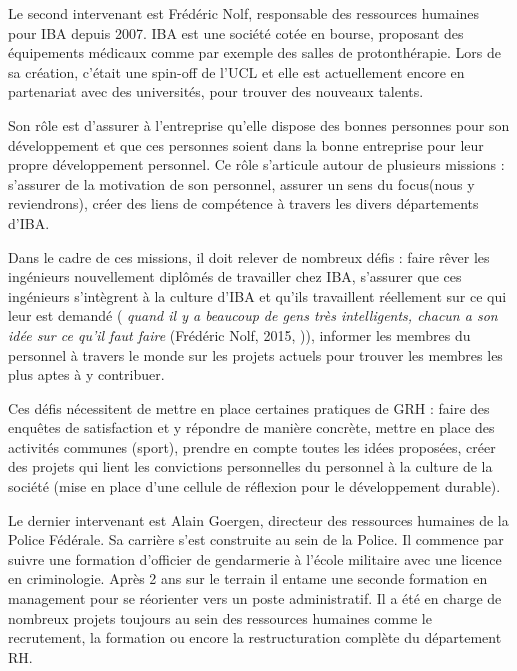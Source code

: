 Le second intervenant est Frédéric Nolf, responsable des ressources humaines pour IBA depuis 2007. IBA est une société cotée en bourse, proposant des équipements médicaux comme par exemple des salles de protonthérapie. Lors de sa création, c'était une spin-off de l'UCL et elle est actuellement encore en partenariat avec des universités, pour trouver des nouveaux talents. \newline

Son rôle est d'assurer à l'entreprise qu'elle dispose des bonnes personnes pour son développement et que ces personnes soient dans la bonne entreprise pour leur propre développement personnel. Ce rôle s'articule autour de plusieurs missions : s'assurer de la motivation de son personnel, assurer un \og{}sens du focus\fg{}(nous y reviendrons), créer des liens de compétence à travers les divers départements d'IBA. \newline

Dans le cadre de ces missions, il doit relever de nombreux défis : faire rêver les ingénieurs nouvellement diplômés de travailler chez IBA, s'assurer que ces ingénieurs s'intègrent à la culture d'IBA et qu'ils travaillent réellement sur ce qui leur est demandé (\textit{\og{} quand il y a beaucoup de gens très intelligents, chacun a son idée sur ce qu'il faut faire \fg{}} (Frédéric Nolf, 2015, \cite{tableronde})), informer les membres du personnel à travers le monde sur les projets actuels pour trouver les membres les plus aptes à y contribuer. \newline

Ces défis nécessitent de mettre en place certaines pratiques de GRH : faire des enquêtes de satisfaction et y répondre de manière concrète, mettre en place des activités communes (sport), prendre en compte toutes les idées proposées, créer des projets qui lient les convictions personnelles du personnel à la culture de la société (mise en place d'une cellule de réflexion pour le développement durable). \newline

Le dernier intervenant est Alain Goergen, directeur des ressources humaines de la Police Fédérale. Sa carrière s'est construite au sein de la Police. Il commence par suivre une formation d'officier de gendarmerie à l'école militaire avec une licence en criminologie. Après 2 ans sur le terrain il entame une seconde formation en management pour se réorienter vers un poste administratif. Il a été en charge de nombreux projets toujours au sein des ressources humaines comme le recrutement, la formation ou encore la restructuration complète du département RH.\newline

